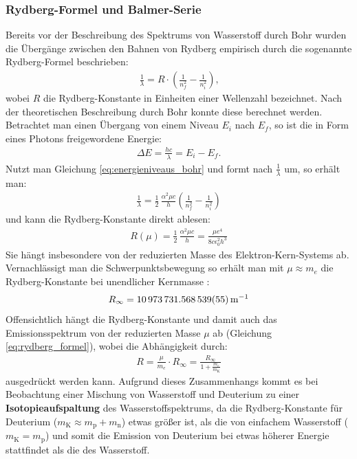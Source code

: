 \documentclass[11pt, a4paper]{article}
\numberwithin{equation}{section}
\begin{document}
\subsubsection{Rydberg-Formel und Balmer-Serie}
\label{sssec:rydberg}
Bereits vor der Beschreibung des Spektrums von Wasserstoff durch Bohr wurden die Übergänge zwischen den Bahnen von Rydberg empirisch durch die sogenannte Rydberg-Formel beschrieben:
\begin{align}
	\label{eq:rydberg_formel}
	\frac{1}{\lambda} = R \cdot \left( \frac{1}{n_f^2} - \frac{1}{n_i^2} \right) \text{,}
\end{align}
wobei $R$ die Rydberg-Konstante in Einheiten einer Wellenzahl bezeichnet.
Nach der theoretischen Beschreibung durch Bohr konnte diese berechnet werden.
Betrachtet man einen Übergang von einem Niveau $E_i$ nach $E_f$, so ist die in Form eines Photons freigewordene Energie:
\begin{align*}
	\Delta E = \frac{h c}{\lambda} = E_i - E_f \text{.}
\end{align*}
Nutzt man Gleichung \ref{eq:energieniveaus_bohr} und formt nach $\frac{1}{\lambda}$ um, so erhält man:
\begin{align*}
	\frac{1}{\lambda} = \frac{1}{2} \, \frac{\alpha^2 \mu c}{h} \left( \frac{1}{n_f^2} - \frac{1}{n_i^2}\right)
\end{align*}
und kann die Rydberg-Konstante direkt ablesen:
\begin{align}
\label{eq:rydberg_konstante}
R(\mu) = \frac{1}{2} \, \frac{\alpha^2 \mu c}{h} = \frac{\mu e^4}{8 c \epsilon_0^2 h^3}
\end{align}
Sie hängt insbesondere von der reduzierten Masse des Elektron-Kern-Systems ab.
Vernachlässigt man die Schwerpunktsbewegung so erhält man mit $\mu \approx m_e$ die Rydberg-Konstante bei unendlicher Kernmasse \cite{CODATA}:
\begin{align*}
	R_\infty = \SI{10973731.568539 +- 0.000055}{\per\metre}
\end{align*}
Offensichtlich hängt die Rydberg-Konstante und damit auch das Emissionsspektrum von der reduzierten Masse $\mu$ ab (Gleichung \ref{eq:rydberg_formel}), wobei die Abhängigkeit durch:
\begin{align*}
	R = \frac{\mu}{m_e} \cdot R_\infty = \frac{R_\infty}{1 + \frac{m_e}{m_\mathrm{K}}}
\end{align*}
ausgedrückt werden kann.
Aufgrund dieses Zusammenhangs kommt es bei Beobachtung einer Mischung von Wasserstoff und Deuterium zu einer \textbf{Isotopieaufspaltung} des Wasserstoffspektrums, da die Rydberg-Konstante für Deuterium ($m_\mathrm{K} \approx m_\mathrm{p} + m_\mathrm{n}$) etwas größer ist, als die von einfachem Wasserstoff ($m_\mathrm{K} = m_\mathrm{p}$) und somit die Emission von Deuterium bei etwas höherer Energie stattfindet als die des Wasserstoff.
\end{document}

